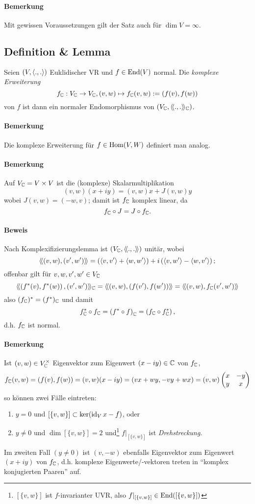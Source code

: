 \paragraph{Bemerkung}
	Mit gewissen Voraussetzungen gilt der Satz auch für $ \dim V = \infty $.

\subsection{Definition \& Lemma}
	Seien $ (V,\langle .,. \rangle) $ Euklidischer VR und $ f\in \operatorname{End}(V) $ normal. Die \emph{komplexe Erweiterung} 
		\[ f_{\mathbb{C}}:V_{\mathbb{C}} \to V_{\mathbb{C}}, (v,w)\mapsto f_{\mathbb{C}}(v,w) := (f(v),f(w)) \]
	von $ f $ ist dann ein normaler Endomorphismus von $ (V_{\mathbb{C}},\langle\! \langle .,. \rangle\! \rangle_{\mathbb{C}}) $.
\paragraph{Bemerkung}
	Die komplexe Erweiterung für $ f\in\operatorname{Hom}(V,W) $ definiert man analog.
\paragraph{Bemerkung}
	Auf $ V_{\mathbb{C}} = V\times V $ ist die (komplexe) Skalarmultiplikation
		\[ (v,w)(x+iy) = (v,w)x+J(v,w)y \]
	wobei $ J(v,w) = (-w,v) $; damit ist $ f_{\mathbb{C}} $ komplex linear, da 
		\[ f_{\mathbb{C}} \circ J = J\circ f_{\mathbb{C}}. \]
\paragraph{Beweis}
	Nach Komplexifizierungslemma ist $ (V_{\mathbb{C}},\langle\! \langle .,. \rangle\! \rangle) $ unitär, wobei
		\[ \langle\! \langle (v,w),(v',w') \rangle\! \rangle = \left(\langle v,v' \rangle+\langle w,w' \rangle\right)+i\left(\langle v,w' \rangle-\langle w,v' \rangle\right); \]
	offenbar gilt für $ v,w,v',w'\in V_{\mathbb{C}} $
		\[ \langle\! \langle \left(f^*(v),f^*(w)\right),(v',w') \rangle\! \rangle_{\mathbb{C}} = \langle\! \langle (v,w),\left(f(v'),f(w')\right) \rangle\! \rangle = \langle\! \langle (v,w),f_{\mathbb{C}}(v',w') \rangle\! \rangle \]
	also $ (f_{\mathbb{C}})^*=(f^*)_{\mathbb{C}} $ und damit
		\[ f_{\mathbb{C}}^* \circ f_{\mathbb{C}} = \left(f^* \circ f\right)_{\mathbb{C}} = \left(f_{\mathbb{C}} \circ f^*_{\mathbb{C}} \right), \]
	d.h. $ f_{\mathbb{C}} $ ist normal.
\paragraph{Bemerkung}
	Ist $ (v,w)\in V_{\mathbb{C}}^\times $ Eigenvektor zum Eigenwert $ (x-iy) \in \mathbb{C} $ von $ f_{\mathbb{C}} $,
		\[ f_{\mathbb{C}}(v,w) = \left(f(v),f(w)\right) = (v,w)(x-iy) = (vx+wy,-vy+wx) = (v,w)
			\begin{pmatrix}
				x & -y\\ y & x
			\end{pmatrix} \]
	so können zwei Fälle eintreten:
		\begin{enumerate}
			\item $ y=0 $ und $ [\{v,w\}] \subset \ker (\operatorname{id}_Vx-f) $, oder
			\item $ y\neq 0 $ und $ \dim [\{v,w\}] = 2 $ und\footnote{$ [\{v,w\}] $ ist $ f $-invarianter UVR, also $ f|_{[\{v,w\}]} \in \operatorname{End}([\{v,w\}])$} $ f|_{[\{v,w\}]} $ ist \emph{Drehstreckung}.
		\end{enumerate}
	Im zweiten Fall $ (y\neq 0) $ ist $ (v,-w) $ ebenfalls Eigenvektor zum Eigenwert $ (x+iy) $ von $ f_{\mathbb{C}} $, d.h. komplexe Eigenwerte/-vektoren treten in "`komplex konjugierten Paaren"' auf.
	

